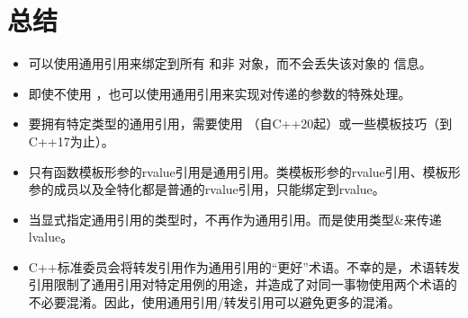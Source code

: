 \section{总结}
\begin{itemize}
	\item 可以使用通用引用来绑定到所有  和非  对象，而不会丢失该对象的  信息。
	\item 即使不使用 ，也可以使用通用引用来实现对传递的参数的特殊处理。
	\item 要拥有特定类型的通用引用，需要使用 （自C++20起）或一些模板技巧（到C++17为止）。
	\item 只有函数模板形参的rvalue引用是通用引用。类模板形参的rvalue引用、模板形参的成员以及全特化都是普通的rvalue引用，只能绑定到rvalue。
	\item 当显式指定通用引用的类型时，不再作为通用引用。而是使用类型\&来传递lvalue。
	\item C++标准委员会将转发引用作为通用引用的“更好”术语。不幸的是，术语转发引用限制了通用引用对特定用例的用途，并造成了对同一事物使用两个术语的不必要混淆。因此，使用通用引用/转发引用可以避免更多的混淆。
\end{itemize}


